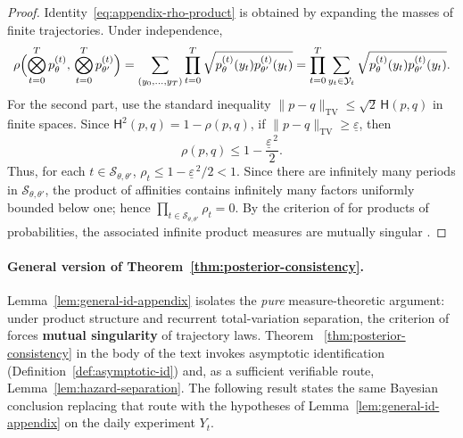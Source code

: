 \documentclass[12pt,a4paper]{article}
\providecommand{\textcite}{\citet}
\theoremstyle{plain}
\theoremstyle{definition}
\theoremstyle{remark}
\newcommand{\1}{\mathbf{1}}
\begin{document}
\begin{proof}
Identity~\eqref{eq:appendix-rho-product} is obtained by expanding the masses of finite
trajectories. Under independence,
\[
\rho\Bigl(\bigotimes_{t=0}^{T} p_\theta^{(t)},\,\bigotimes_{t=0}^{T} p_{\theta'}^{(t)}\Bigr)
=\sum_{(y_0,\ldots,y_T)}\prod_{t=0}^{T}\sqrt{p_\theta^{(t)}(y_t)p_{\theta'}^{(t)}(y_t)}
=\prod_{t=0}^{T}\sum_{y_t\in\mathcal{Y}_t}\sqrt{p_\theta^{(t)}(y_t)p_{\theta'}^{(t)}(y_t)}.
\]
For the second part, use the standard inequality
$\|p-q\|_{\mathrm{TV}}\le \sqrt{2}\,\mathsf{H}(p,q)$ in finite spaces. Since
$\mathsf{H}^2(p,q)=1-\rho(p,q)$, if
$\|p-q\|_{\mathrm{TV}}\ge\underline{\varepsilon}$, then
\[
\rho(p,q)\le 1-\frac{\underline{\varepsilon}^{\,2}}{2}.
\]
Thus, for each $t\in\mathcal{S}_{\theta,\theta'}$,
$\rho_t\le 1-\underline{\varepsilon}^{\,2}/2<1$. Since there are infinitely many
periods in $\mathcal{S}_{\theta,\theta'}$, the product of affinities contains
infinitely many factors uniformly bounded below one; hence
$\prod_{t\in\mathcal{S}_{\theta,\theta'}}\rho_t=0$. By the criterion of
\textcite{Kakutani1948} for products of probabilities, the associated infinite product
measures are mutually singular \textcite{Shiryaev2019Probability}.
\end{proof}

\medskip
\paragraph{General version of Theorem~\ref{thm:posterior-consistency}.}
Lemma~\ref{lem:general-id-appendix} isolates the \emph{pure} measure-theoretic argument:
under product structure and recurrent total-variation separation, the criterion of
\textcite{Kakutani1948} forces \textbf{mutual singularity} of trajectory laws. Theorem
~\ref{thm:posterior-consistency} in the body of the text invokes asymptotic
identification \textup{(Definition~\ref{def:asymptotic-id})} and, as a sufficient
verifiable route, Lemma~\ref{lem:hazard-separation}. The following result states the
same Bayesian conclusion replacing that route with the hypotheses of
Lemma~\ref{lem:general-id-appendix} on the daily experiment $Y_t$.
\end{document}
